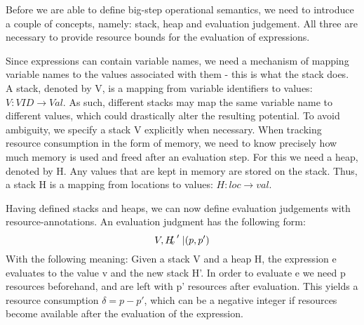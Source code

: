 Before we are able to define big-step operational semantics, we need to introduce a couple of concepts, namely: stack, heap and evaluation judgement. All three are necessary to provide resource bounds for the evaluation of expressions.

Since expressions can contain variable names, we need a mechanism of mapping variable names to the values associated with them - this is what the stack does. A stack, denoted by V, is a mapping from variable identifiers to values: $V : VID \to Val$. As such, different stacks may map the same variable name to different values, which could drastically alter the resulting potential. To avoid ambiguity, we specify a stack V explicitly when necessary. 
When tracking resource consumption in the form of memory, we need to know precisely how much memory is used and freed after an evaluation step. For this we need a heap, denoted by H. Any values that are kept in memory are stored on the stack. Thus, a stack H is a mapping from locations to values: $H : loc \to val$. 

Having defined stacks and heaps, we can now define evaluation judgements with resource-annotations. An evaluation judgment has the following form:
$$ V, H \turnstile e \rightsquigarrow v, H' | (p, p') $$
With the following meaning: Given a stack V and a heap H, the expression e evaluates to the value v and the new stack H'. In order to evaluate e we need p resources beforehand, and are left with p' resources after evaluation. This yields a resource consumption $\delta = p - p'$, which can be a negative integer if resources become available after the evaluation of the expression.


